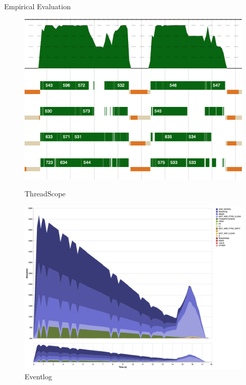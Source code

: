 \documentclass{beamer}
\begin{document}
  \begin{frame}[fragile]{Empirical Evaluation}

    \begin{figure}[!htb]
      \centering
      \begin{minipage}{0.48\textwidth}
       \includegraphics[width=1\linewidth, height=0.5\textheight]{screen_2}
       \caption{ThreadScope}
      \end{minipage}%
      \begin{minipage}{0.48\textwidth}
         \includegraphics[width=1\linewidth, height=0.5\textheight]{visualization}
         \caption{Eventlog}
      \end{minipage}
     \end{figure}

  \end{frame}
\end{document}
